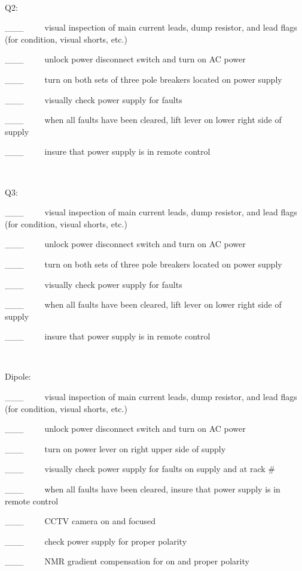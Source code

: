 ~

Q2:~~~~~

\_\_\_~~~~~visual inspection of main current leads, dump resistor, and lead
flags (for condition, visual shorts, etc.)

\_\_\_~~~~~unlock power disconnect switch and turn on AC power

\_\_\_~~~~~turn on both sets of three pole breakers located on power supply

\_\_\_~~~~~visually check power supply for faults

\_\_\_~~~~~when all faults have been cleared, lift lever on lower right side
of supply

\_\_\_~~~~~insure that power supply is in remote control

~

Q3:

\_\_\_~~~~~visual inspection of main current leads, dump resistor, and lead
flags (for condition, visual shorts, etc.)

\_\_\_~~~~~unlock power disconnect switch and turn on AC power

\_\_\_~~~~~turn on both sets of three pole breakers located on power supply

\_\_\_~~~~~visually check power supply for faults

\_\_\_~~~~~when all faults have been cleared, lift lever on lower right side
of supply

\_\_\_~~~~~insure that power supply is in remote control

~

Dipole:

\_\_\_~~~~~visual inspection of main current leads, dump resistor, and lead
flags (for condition, visual shorts, etc.)

\_\_\_~~~~~unlock power disconnect switch and turn on AC power

\_\_\_~~~~~turn on power lever on right upper side of supply

\_\_\_~~~~~visually check power supply for faults on supply and at rack \#

\_\_\_~~~~~when all faults have been cleared, insure that power supply is in
remote control

\_\_\_~~~~~CCTV camera on and focused

\_\_\_~~~~~check power supply for proper polarity 

\_\_\_~~~~~NMR gradient compensation for on and proper polarity

~

